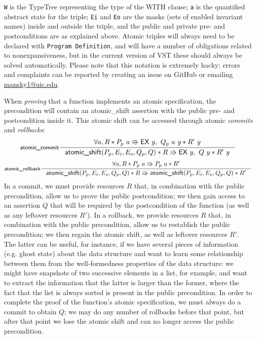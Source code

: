 \documentclass[11pt]{article} %
\begin{document}
\texttt{W} is the \textsf{TypeTree} representing the type of the WITH clause; \texttt{a} is the quantified abstract state for the triple; \texttt{Ei} and \texttt{Eo} are the masks (sets of enabled invariant names) inside and outside the triple, and the public and private pre- and postconditions are as explained above. Atomic triples will always need to be declared with \texttt{Program Definition}, and will have a number of obligations related to nonexpansiveness, but in the current version of VST these should always be solved automatically. Please note that this notation is extremely hacky; errors and complaints can be reported by creating an issue on GitHub or emailing \url{mansky1@uic.edu}.

When \emph{proving} that a function implements an atomic specification, the precondition will contain an \textsf{atomic\_shift} assertion with the public pre- and postcondition inside it. This atomic shift can be accessed through atomic \emph{commits} and \emph{rollbacks}:
$$\inference[\textsf{atomic\_commit}]{\forall a, R * P_p\ a \Rrightarrow \mathsf{EX}\ y,\ Q_p\ a\ y * R'\ y}{\textsf{atomic\_shift}(P_p, E_i, E_o, Q_p, Q) * R \Rrightarrow \mathsf{EX}\ y,\ Q\ y * R'\ y}$$
$$\inference[\textsf{atomic\_rollback}]{\forall a, R * P_p\ a \Rrightarrow P_p\ a * R'}{\textsf{atomic\_shift}(P_p, E_i, E_o, Q_p, Q) * R \Rrightarrow \textsf{atomic\_shift}(P_p, E_i, E_o, Q_p, Q) * R'}$$
In a commit, we must provide resources $R$ that, in combination with the public precondition, allow us to prove the public postcondition; we then gain access to an assertion $Q$ that will be required by the postcondition of the function (as well as any leftover resources $R'$). In a rollback, we provide resources $R$ that, in combination with the public precondition, allow us to restablish the public precondition; we then regain the atomic shift, as well as leftover resources $R'$. The latter can be useful, for instance, if we have several pieces of information (e.g. ghost state) about the data structure and want to learn some relationship between them from the well-formedness properties of the data structure: we might have snapshots of two successive elements in a list, for example, and want to extract the information that the latter is larger than the former, where the fact that the list is always sorted is present in the public precondition. In order to complete the proof of the function's atomic specification, we must always do a commit to obtain $Q$; we may do any number of rollbacks before that point, but after that point we lose the atomic shift and can no longer access the public precondition.
\end{document}
